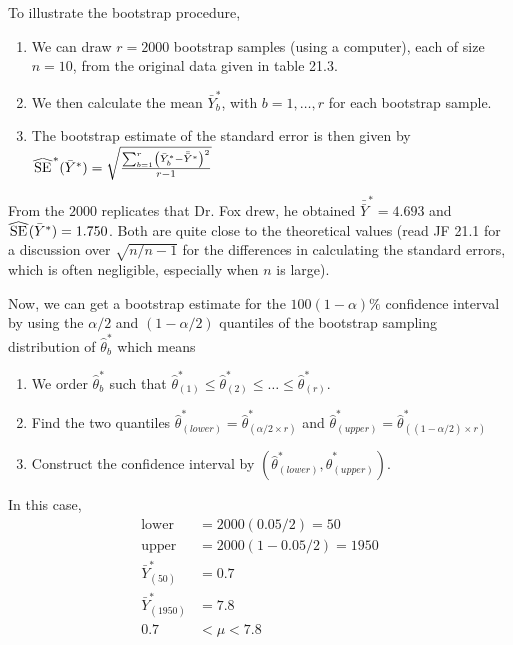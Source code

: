 To illustrate the bootstrap procedure, 
\begin{enumerate}
	\item We can draw $r = 2000$ bootstrap samples (using a computer), each of size $n = 10$, from the original data given in table 21.3.
	\item We then calculate the mean $\bar{Y}_b^*$, with $b= 1, \dots, r$ for each bootstrap sample.
	\item The bootstrap estimate of the standard error is then given by $\reallywidehat{SE}^*(\bar{Y}^*) = \sqrt{\frac{\sum_{b= 1}^{r} \left(\bar{Y}_b^* - \bar{\bar{Y}}^*\right)^2}{r - 1}}$
\end{enumerate}
From the $2000$ replicates that Dr. Fox drew, he obtained $\bar{\bar{Y}}^* = 4.693$ and $\reallywidehat{SE}(\bar{Y}^*) = 1.750$.  Both are quite close to the theoretical values (read JF 21.1 for a discussion over $\sqrt{n /{n - 1}}$ for the differences in calculating the standard errors, which is often negligible, especially when $n$ is large).

Now, we can get a bootstrap estimate for the $100(1 - \alpha)\%$ confidence interval by
using the $\alpha /2$ and $(1 -  \alpha /2)$ quantiles of the bootstrap sampling distribution of $\hat{\theta}_b^*$ which means
\begin{enumerate}
	\item We order $\hat{\theta}_b^*$ such that $\hat{\theta}_{(1)}^* \le \hat{\theta}_{(2)}^* \le \dots \le \hat{\theta}_{(r)}^*$.
	\item Find the two quantiles $\hat{\theta}^*_{(lower)} = \hat{\theta}_{(\alpha / 2 \times r)}^*$ and $\hat{\theta}^*_{(upper)} = \hat{\theta}_{((1 - \alpha / 2) \times r)}^*$
	\item Construct the confidence interval by $(\hat{\theta}^*_{(lower)}, \hat{\theta}^*_{(upper)})$.
\end{enumerate}
In this case,
$$
\begin{aligned}
	\mbox{lower} &= 2000 (0.05 / 2) = 50\\
	\mbox{upper} &= 2000 (1 - 0.05 / 2) = 1950\\
	\bar{Y}_{(50)}^* &= 0.7\\
	\bar{Y}_{(1950)}^* &= 7.8\\
	0.7 &< \mu < 7.8 \\
\end{aligned}
$$

